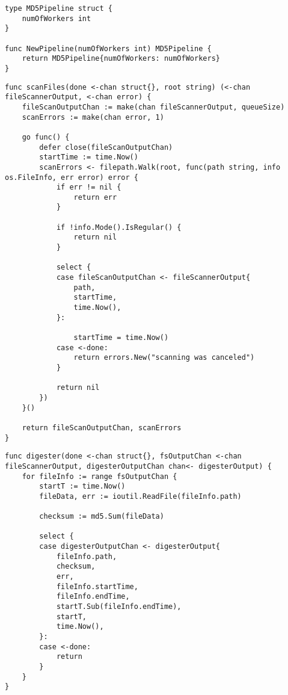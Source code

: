 \begin{lstlisting}[label=lst:pipeline,caption={Определение структуры конвеера}]
type MD5Pipeline struct {
    numOfWorkers int
}

func NewPipeline(numOfWorkers int) MD5Pipeline {
    return MD5Pipeline{numOfWorkers: numOfWorkers}
}
\end{lstlisting}
    

\begin{lstlisting}[label=lst:fs,caption={Лента обхода файловой системы}]
func scanFiles(done <-chan struct{}, root string) (<-chan fileScannerOutput, <-chan error) {
	fileScanOutputChan := make(chan fileScannerOutput, queueSize)
	scanErrors := make(chan error, 1)

	go func() {
		defer close(fileScanOutputChan)
		startTime := time.Now()
		scanErrors <- filepath.Walk(root, func(path string, info os.FileInfo, err error) error {
			if err != nil {
				return err
			}

			if !info.Mode().IsRegular() {
				return nil
			}

			select {
			case fileScanOutputChan <- fileScannerOutput{
				path,
				startTime,
				time.Now(),
			}:

				startTime = time.Now()
			case <-done:
				return errors.New("scanning was canceled")
			}

			return nil
		})
	}()

	return fileScanOutputChan, scanErrors
}
\end{lstlisting}

\begin{lstlisting}[label=lst:dig,caption={Лента вычисления хеш-суммы}]
func digester(done <-chan struct{}, fsOutputChan <-chan fileScannerOutput, digesterOutputChan chan<- digesterOutput) {
    for fileInfo := range fsOutputChan {
        startT := time.Now()
        fileData, err := ioutil.ReadFile(fileInfo.path)

        checksum := md5.Sum(fileData)

        select {
        case digesterOutputChan <- digesterOutput{
            fileInfo.path,
            checksum,
            err,
            fileInfo.startTime,
            fileInfo.endTime,
            startT.Sub(fileInfo.endTime),
            startT,
            time.Now(),
        }:
        case <-done:
            return
        }
    }
}
\end{lstlisting}

